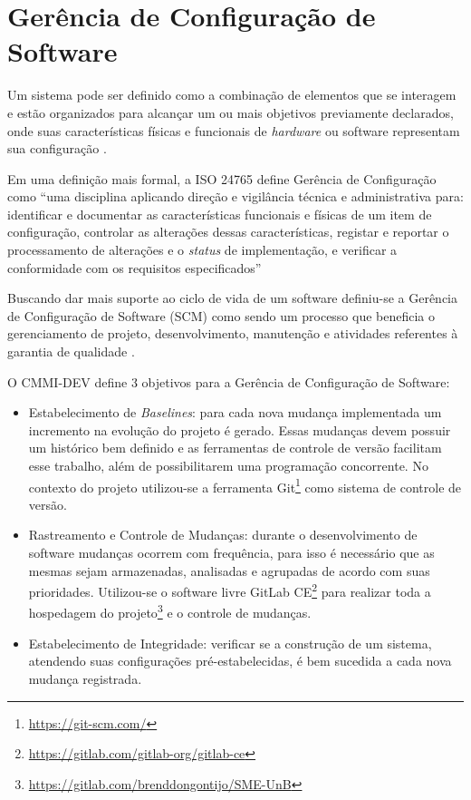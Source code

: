 \chapter{Gerência de Configuração de Software}
Um sistema pode ser definido como a combinação de elementos que se interagem e estão organizados para alcançar um ou mais objetivos previamente declarados, onde suas características físicas e funcionais de \textit{hardware} ou software representam sua configuração \cite{SWEBOK2014}.

Em uma definição mais formal, a ISO 24765 \cite{iso_24765} define Gerência de Configuração como ``uma disciplina aplicando direção e vigilância técnica e administrativa para: identificar e documentar as características funcionais e físicas de um item de configuração, controlar as alterações dessas características, registar e reportar o processamento de alterações e o \textit{status} de implementação, e verificar a conformidade com os requisitos especificados''

Buscando dar mais suporte ao ciclo de vida de um software definiu-se a Gerência de Configuração de Software (SCM) como sendo um processo que beneficia o gerenciamento de projeto, desenvolvimento, manutenção e atividades referentes à garantia de qualidade \cite{SWEBOK2014}.

O CMMI-DEV \cite{cmmi_dev} define 3 objetivos para a Gerência de Configuração de Software:
\begin{itemize}
    \item Estabelecimento de \textit{Baselines}: para cada nova mudança implementada um incremento na evolução do projeto é gerado. Essas mudanças devem possuir um histórico bem definido e as ferramentas de controle de versão facilitam esse trabalho, além de possibilitarem uma programação concorrente. No contexto do projeto utilizou-se a ferramenta Git\footnote{\url{https://git-scm.com/}} como sistema de controle de versão.
    \item Rastreamento e Controle de Mudanças: durante o desenvolvimento de software mudanças ocorrem com frequência, para isso é necessário que as mesmas sejam armazenadas, analisadas e agrupadas de acordo com suas prioridades. Utilizou-se o software livre GitLab CE\footnote{\url{https://gitlab.com/gitlab-org/gitlab-ce}} para realizar toda a hospedagem do projeto\footnote{\url{https://gitlab.com/brenddongontijo/SME-UnB}} e o controle de mudanças.
    \item Estabelecimento de Integridade: verificar se a construção de um sistema, atendendo suas configurações pré-estabelecidas, é bem sucedida a cada nova mudança registrada.
\end{itemize}